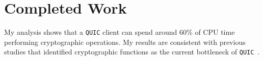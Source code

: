 \documentclass[12pt,a4paper,twoside,openright]{report}
\begin{document}



\section{Completed Work}
My analysis shows that a \texttt{QUIC} client can spend around 60\% of CPU time performing cryptographic operations. 
My results are consistent with previous studies that identified cryptographic functions as the current bottleneck of \texttt{QUIC}~\cite{Making_QUIC_Quicker}.


















\end{document}
